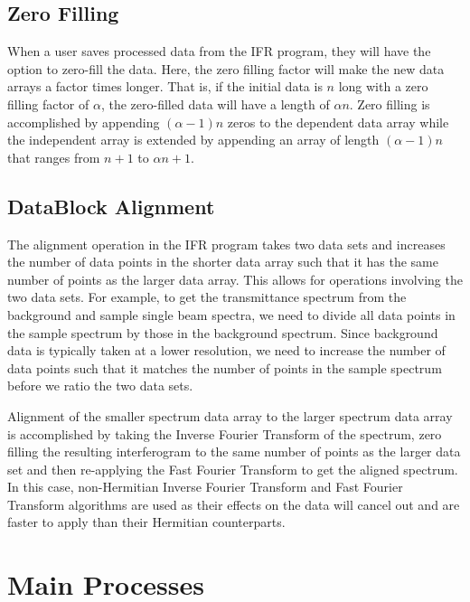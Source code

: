 \documentclass[a4paper, 12pt]{report}
\begin{document}
    \subsection{Zero Filling}\label{zero_fill}
    
    When a user saves processed data from the IFR program, they will have the option to zero-fill the data. Here, the zero filling factor will make the new data arrays a factor times longer. That is, if the initial data is $n$ long with a zero filling factor of $\alpha$, the zero-filled data will have a length of $\alpha n$. Zero filling is accomplished by appending $(\alpha - 1)n$ zeros to the dependent data array while the independent array is extended by appending an array of length $(\alpha - 1)n$ that ranges from $n+1$ to $\alpha n + 1$.
    
    \subsection{DataBlock Alignment}\label{DataBlock_alignment}
    
    The alignment operation in the IFR program takes two data sets and increases the number of data points in the shorter data array such that it has the same number of points as the larger data array. This allows for operations involving the two data sets. For example, to get the transmittance spectrum from the background and sample single beam spectra, we need to divide all data points in the sample spectrum by those in the background spectrum. Since background data is typically taken at a lower resolution, we need to increase the number of data points such that it matches the number of points in the sample spectrum before we ratio the two data sets.
    
    Alignment of the smaller spectrum data array to the larger spectrum data array is accomplished by taking the Inverse Fourier Transform of the spectrum, zero filling the resulting interferogram to the same number of points as the larger data set and then re-applying the Fast Fourier Transform to get the aligned spectrum. In this case, non-Hermitian Inverse Fourier Transform and Fast Fourier Transform algorithms are used as their effects on the data will cancel out and are faster to apply than their Hermitian counterparts.
    
    \section{Main Processes}\label{main_processes}
    
\end{document}

